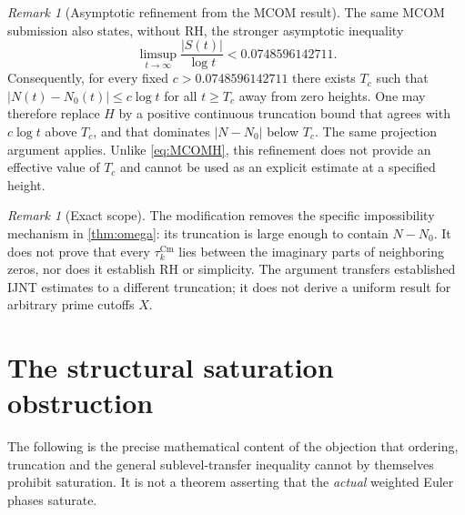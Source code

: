 \documentclass[11pt,a4paper]{article}
\numberwithin{equation}{section}
\theoremstyle{definition}
\theoremstyle{remark}
\newtheorem{remark}[theorem]{Remark}
\newcommand{\Cm}{\mathrm{Cm}}
\begin{document}
\begin{remark}[Asymptotic refinement from the MCOM result]\label{rem:MCOM-asympt}
The same MCOM submission also states, without RH, the stronger asymptotic inequality
\begin{equation}\label{eq:asymptMCOM}
\limsup_{t\to\infty}\frac{|S(t)|}{\log t}<0.0748596142711.
\end{equation}
Consequently, for every fixed $c>0.0748596142711$ there exists $T_c$ such that
$|N(t)-N_0(t)|\le c\log t$ for all $t\ge T_c$ away from zero heights. One may therefore replace $H$ by a positive continuous truncation bound that agrees with $c\log t$ above $T_c$, and that dominates $|N-N_0|$ below $T_c$. The same projection argument applies. Unlike \eqref{eq:MCOMH}, this refinement does not provide an effective value of $T_c$ and cannot be used as an explicit estimate at a specified height.
\end{remark}

\begin{remark}[Exact scope]\label{rem:taucm-scope}
The modification removes the specific impossibility mechanism in \cref{thm:omega}: its truncation is large enough to contain $N-N_0$. It does not prove that every $\tau_k^{\Cm}$ lies between the imaginary parts of neighboring zeros, nor does it establish RH or simplicity. The argument transfers established IJNT estimates to a different truncation; it does not derive a uniform result for arbitrary prime cutoffs $X$.
\end{remark}

\section{The structural saturation obstruction}\label{sec:saturation}
The following is the precise mathematical content of the objection that ordering, truncation and the general sublevel-transfer inequality cannot by themselves prohibit saturation. It is not a theorem asserting that the \emph{actual} weighted Euler phases saturate.
\end{document}
